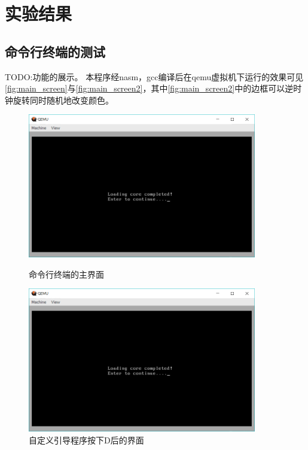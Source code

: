\documentclass[forprint]{WHUBachelor}
\begin{document}
\chapter{实验结果}




\section{命令行终端的测试}

TODO:功能的展示。
本程序经nasm，gcc编译后在qemu虚拟机下运行的效果可见\autoref{fig:main_screen}与\autoref{fig:main_screen2}，其中\autoref{fig:main_screen2}中的边框可以逆时钟旋转同时随机地改变颜色。
\begin{figure}[htp]
  \centering
  \begin{minipage}[t]{0.5\linewidth} 
    \centering
  \includegraphics[width=10cm]{"./figure/main_screen.png"}
  \caption{命令行终端的主界面}
  \label{fig:main_screen}
\end{minipage}

  \begin{minipage}[t]{0.5\linewidth} 
  \centering
  \includegraphics[width=10cm]{"./figure/main_screen.png"}
  \caption{自定义引导程序按下D后的界面}
  \label{fig:main_screen2}
\end{minipage}
\end{figure}
\end{document}
